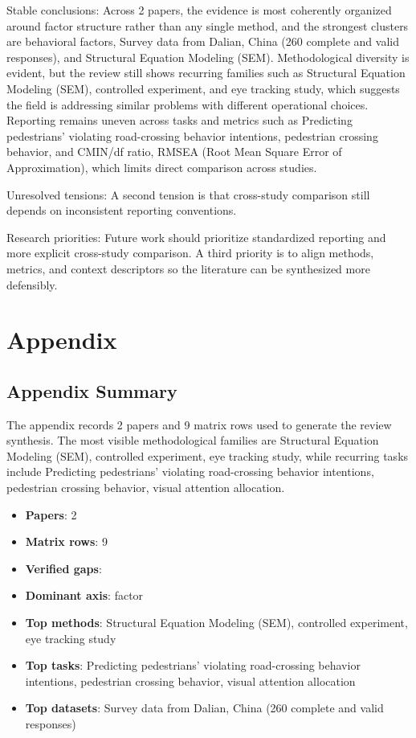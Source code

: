 \documentclass{article}
\begin{document}
Stable conclusions: Across 2 papers, the evidence is most coherently organized around factor structure rather than any single method, and the strongest clusters are behavioral factors, Survey data from Dalian, China (260 complete and valid responses), and Structural Equation Modeling (SEM). Methodological diversity is evident, but the review still shows recurring families such as Structural Equation Modeling (SEM), controlled experiment, and eye tracking study, which suggests the field is addressing similar problems with different operational choices. Reporting remains uneven across tasks and metrics such as Predicting pedestrians' violating road-crossing behavior intentions, pedestrian crossing behavior, and CMIN/df ratio, RMSEA (Root Mean Square Error of Approximation), which limits direct comparison across studies. \cite{08_2016_zhou_aap,09_2018_jiang_aap}

Unresolved tensions: A second tension is that cross-study comparison still depends on inconsistent reporting conventions. \cite{08_2016_zhou_aap,09_2018_jiang_aap}

Research priorities: Future work should prioritize standardized reporting and more explicit cross-study comparison. A third priority is to align methods, metrics, and context descriptors so the literature can be synthesized more defensibly. \cite{08_2016_zhou_aap,09_2018_jiang_aap}

\appendix
\section{Appendix}
\subsection{Appendix Summary}
\noindent The appendix records 2 papers and 9 matrix rows used to generate the review synthesis. The most visible methodological families are Structural Equation Modeling (SEM), controlled experiment, eye tracking study, while recurring tasks include Predicting pedestrians' violating road-crossing behavior intentions, pedestrian crossing behavior, visual attention allocation.

\begin{itemize}
\item \textbf{Papers}: 2
\item \textbf{Matrix rows}: 9
\item \textbf{Verified gaps}: 
\item \textbf{Dominant axis}: factor
\item \textbf{Top methods}: Structural Equation Modeling (SEM), controlled experiment, eye tracking study
\item \textbf{Top tasks}: Predicting pedestrians' violating road-crossing behavior intentions, pedestrian crossing behavior, visual attention allocation
\item \textbf{Top datasets}: Survey data from Dalian, China (260 complete and valid responses)
\end{itemize}
\end{document}
